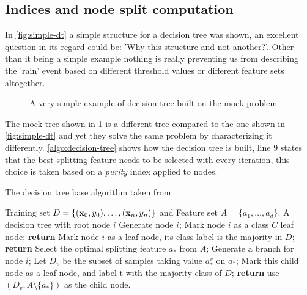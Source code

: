 \subsection{Indices and node split computation}
In \cref{fig:simple-dt} a simple structure for a decision tree was shown, an excellent question in
its regard could be: 'Why this structure and not another?'. Other than it being a simple example
nothing is really preventing us from describing the 'rain' event based on different threshold values
or different feature sets altogether.
\begin{figure}
	\centering
	\caption{A very simple example of decision tree built on the mock problem}
	\label{fig:simple-dt-alt}
\end{figure}
The mock tree shown in \cref{fig:simple-dt-alt} is a different tree compared to the one shown in
\cref{fig:simple-dt} and yet they solve the same problem by characterizing it differently.
\cref{algo:decision-tree} shows how the decision tree is built, line $9$ states that the best
splitting feature needs to be selected with every iteration, this choice is taken based on a
\emph{purity} index applied to nodes.

\begin{algorithm}
	\caption{The decision tree base algorithm taken from
		\cite{ZhouZhi-Hua2021ML}}\label{algo:decision-tree}
	\begin{algorithmic}[1]
		\Require Training set $D = \{(\mathbf{x}_0, y_0), \ldots, (\mathbf{x}_n, y_n)\}$ and Feature set $A = \{a_1, \ldots,
			a_d\}$.
		\Ensure A decision tree with root node $i$
		\State Generate node $i$;
		\State Mark node $i$ as a class $C$ leaf node; \textbf{return}
		\EndIf
		\State Mark node $i$ as a leaf node, its class label is
		the majority in $D$; \textbf{return}
		\EndIf
		\State Select the optimal splitting feature $a_*$ from $A$;
		\State Generate a branch for node $i$; Let $D_v$ be the
		subset of samples taking value $a_*^v$ on $a_*$;
		\State Mark this child node as a leaf node, and
		label t with the majority class of $D$;
		\textbf{return}
		\Else
		\State use $(D_v, A \setminus \{a_*\})$ as the child node.
		\EndIf
		\EndFor
		\EndFunction
	\end{algorithmic}
\end{algorithm}

